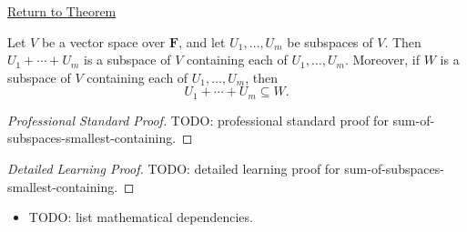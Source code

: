 \newpage
{}
\label{prf:sum-of-subspaces-smallest-containing}

\begin{remark*}[Return]
\hyperref[thm:sum-of-subspaces-smallest-containing]{Return to Theorem}
\end{remark*}

\begin{theorem*}
Let $V$ be a vector space over $\mathbf{F}$, and let
$U_1,\dots,U_m$ be subspaces of $V$.
Then $U_1+\cdots+U_m$ is a subspace of $V$ containing each of
$U_1,\dots,U_m$.
Moreover, if $W$ is a subspace of $V$ containing each of
$U_1,\dots,U_m$, then
\[
U_1+\cdots+U_m \subseteq W.
\]
\end{theorem*}

\begin{proof}[Professional Standard Proof]
\LRAProofBodyStart
TODO: professional standard proof for sum-of-subspaces-smallest-containing.
\end{proof}

\begin{proof}[Detailed Learning Proof]
\LRAProofBodyStart
TODO: detailed learning proof for sum-of-subspaces-smallest-containing.
\end{proof}

\begin{remark*}
\end{remark*}

\begin{dependencies}
\begin{itemize}
  \item TODO: list mathematical dependencies.
\end{itemize}
\end{dependencies}

\clearpage

